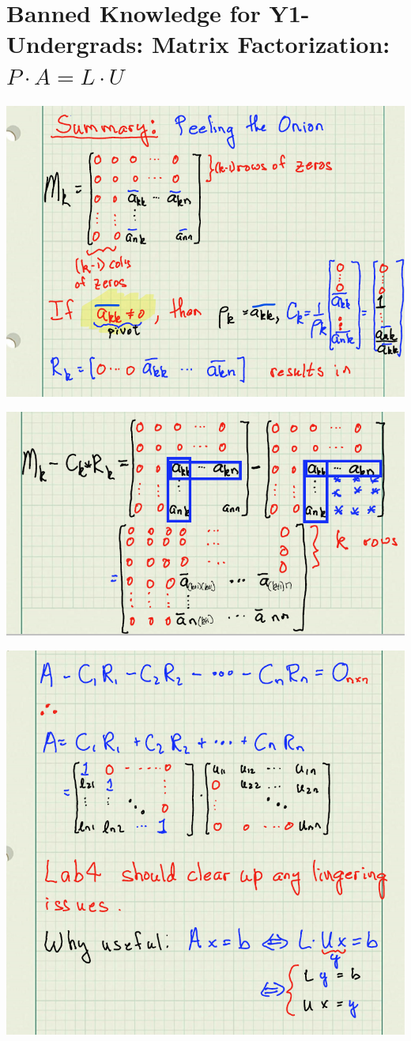 \documentclass[letterpaper]{book}
\begin{document}
\setcounter{chapter}{5}
\setcounter{section}{-1}
\section{Banned Knowledge for Y1-Undergrads: Matrix Factorization: $P \cdot A = L \cdot U$}

\begin{center}

\includegraphics[width=0.9\columnwidth]{graphics/Summary/PeelingTheOnionPart01.png}

\includegraphics[width=0.9\columnwidth]{graphics/Summary/PeelingTheOnionPart02.png}

\includegraphics[width=0.8\columnwidth]{graphics/Summary/PeelingTheOnionPart03.png}


\end{center}
\end{document}
